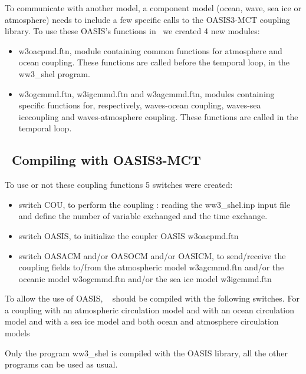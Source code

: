 To communicate with another model, a component model (ocean, wave, sea ice or atmosphere) needs to include a few specific calls to the OASIS3-MCT coupling library. To use these OASIS's functions in \ws\ we created 4 new modules:
\begin{itemize}
\item {\file w3oacpmd.ftn}, module containing common functions for atmosphere and ocean coupling. These functions are called before the temporal loop, in the {\code ww3\_shel} program.
\item {\file w3ogcmmd.ftn}, {\file w3igcmmd.ftn} and {\file w3agcmmd.ftn}, modules containing specific functions for, respectively, waves-ocean coupling,  waves-sea icecoupling and waves-atmosphere coupling.  These functions are called in the temporal loop.
\end{itemize}

\vssub
\subsection{~Compiling with OASIS3-MCT} \label{sec:couplingB}
\vssub

To use or not these coupling functions 5 switches were created: 

\begin{itemize}
\item switch {\code COU}, to perform the coupling : reading the {\file ww3\_shel.inp} input file and define the number of variable exchanged and the time exchange.
\item switch {\code OASIS}, to initialize the coupler OASIS {\file w3oacpmd.ftn}
\item switch {\code OASACM} and/or {\code OASOCM} and/or {\code OASICM}, to send/receive the coupling fields to/from the atmospheric model {\file w3agcmmd.ftn} and/or the oceanic model {\file w3ogcmmd.ftn} and/or the sea ice model {\file w3igcmmd.ftn}
\end{itemize}

To allow the use of OASIS, \ww~ should be compiled with the following switches. For 
a coupling with an atmospheric circulation model 
and with an ocean circulation model
and with a sea ice model
and both ocean and atmosphere circulation models 

Only the program {\code ww3\_shel} is compiled with the OASIS library, all the other programs can be used as usual. \\

